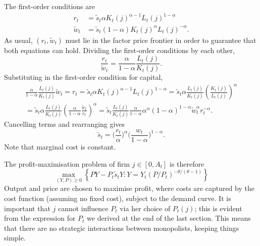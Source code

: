 \documentclass[11pt,letterpaper,reqno,oneside]{article}
\begin{document}
The first-order conditions are
%
\begin{align*}
	r_t &= \widetilde{s}_t \alpha K_t(j)^{\alpha-1} L_t(j)^{1-\alpha}
	\\
	\widetilde{w}_t &= \widetilde{s}_t (1-\alpha) K_t(j)^{\alpha} L_t(j)^{-\alpha} .
\end{align*}
%
As usual, $\left(r_t,\widetilde{w}_t\right)$ must lie in the factor price frontier in order to guarantee that both equations can hold. Dividing the first-order conditions by each other,
%
\begin{equation*}
	\frac{r_t}{\widetilde{w}_t} = \frac{\alpha}{1-\alpha} \frac{L_t(j)}{K_t(j)} .
\end{equation*}
%
Substituting in the first-order condition for capital,
%
\begin{multline*}
	\frac{\alpha}{1-\alpha} \frac{L_t(j)}{K_t(j)} \widetilde{w}_t 
	= r_t
	= \widetilde{s}_t \alpha K_t(j)^{\alpha-1} L_t(j)^{1-\alpha} 
	= \widetilde{s}_t \alpha \frac{L_t(j)}{K_t(j)}
	\left( \frac{K_t(j)}{L_t(j)} \right)^\alpha  
	\\
	= \widetilde{s}_t \alpha \frac{L_t(j)}{K_t(j)}
	\left( \frac{\alpha}{1-\alpha} \frac{\widetilde{w}_t}{r_t} \right)^\alpha  
	= \widetilde{s}_t \frac{L_t(j)}{K_t(j)}
	\frac{\alpha}{1-\alpha}
	\alpha^{\alpha} (1-\alpha)^{1-\alpha} 
	\widetilde{w}_t^\alpha r_t^{-\alpha} .
\end{multline*}
%
Cancelling terms and rearranging gives
%
\begin{equation*}
	\widetilde{s}_t 
	= \biggl( \frac{r_t}{\alpha} \biggr)^\alpha 
	\biggl( \frac{w_t}{1-\alpha} \biggr)^{1-\alpha} .
\end{equation*}
%
Note that marginal cost is constant.


The profit-maximisation problem of firm $j \in [0,A_t]$ is therefore
%
\begin{equation*}
	\max_{(Y,P) \geq 0} \left\{
	P Y - P_t \widetilde{s}_t Y :
	Y = Y_t \left( P/P_t \right)^{-\theta/(\theta-1)}
	\right\}
\end{equation*}
%
Output and price are chosen to maximise profit, where costs are captured by the cost function (assuming no fixed cost), subject to the demand curve. It is important that $j$ cannot influence $P_t$ via her choice of $P_t(j)$; this is evident from the expression for $P_t$ we derived at the end of the last section. This means that there are no strategic interactions between monopolists, keeping things simple.
\end{document}
